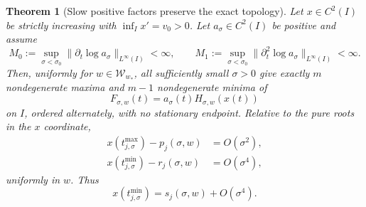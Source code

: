 \documentclass[aps,physrev,onecolumn,amsmath,amssymb,longbibliography]{revtex4-2}
\newtheorem{theorem}{Theorem}[section]
\begin{document}
\begin{theorem}[Slow positive factors preserve the exact topology]
\label{thm:exactmfull-slow-factor}
Let \(x\in C^2(I)\) be strictly increasing with
\(\inf_Ix'=v_0>0\).  Let \(a_\sigma\in C^2(I)\) be positive and assume
\begin{equation}
 M_0:=\sup_{\sigma<\sigma_0}
 \|\partial_t\log a_\sigma\|_{L^\infty(I)}<\infty,
 \qquad
 M_1:=\sup_{\sigma<\sigma_0}
 \|\partial_t^2\log a_\sigma\|_{L^\infty(I)}<\infty.
 \label{eq:exactmfull-slow-factor-hypothesis}
\end{equation}
Then, uniformly for \(w\in\mathcal W_{w_*}\), all sufficiently small
\(\sigma>0\) give exactly \(m\) nondegenerate maxima and \(m-1\)
nondegenerate minima of
\begin{equation}
 F_{\sigma,w}(t)=a_\sigma(t)H_{\sigma,w}(x(t))
 \label{eq:exactmfull-slow-product}
\end{equation}
on \(I\), ordered alternately, with no stationary endpoint.  Relative to the
pure roots in the \(x\) coordinate,
\begin{align}
 x(t_{j,\sigma}^{\max})-p_j(\sigma,w)&=O(\sigma^2),
 \label{eq:exactmfull-slow-peak-shift}\\
 x(t_{j,\sigma}^{\min})-r_j(\sigma,w)&=O(\sigma^4),
 \label{eq:exactmfull-slow-valley-shift}
\end{align}
uniformly in \(w\).  Thus
\begin{equation}
 x(t_{j,\sigma}^{\min})=s_j(\sigma,w)+O(\sigma^4).
 \label{eq:exactmfull-slow-valley-location}
\end{equation}
\end{theorem}
\end{document}
